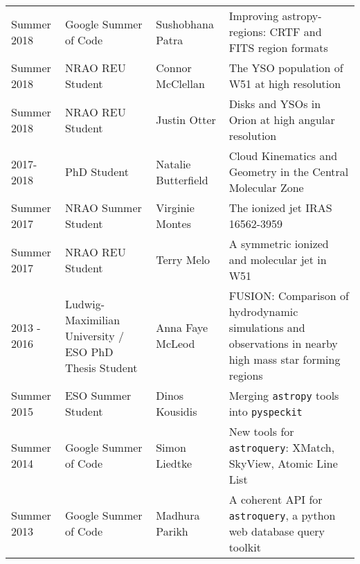 \begin{tabular}{p{0.75in}p{1.3in}lp{2.6in}}
    Summer 2018 & Google Summer of Code &                                         Sushobhana Patra    &  Improving astropy-regions: CRTF and FITS region formats \\
    Summer 2018 & NRAO REU Student &                                              Connor McClellan    &  The YSO population of W51 at high resolution \\
    Summer 2018 & NRAO REU Student &                                              Justin Otter    &  Disks and YSOs in Orion at high angular resolution \\
    2017-2018 & PhD Student &                                                        Natalie Butterfield &  Cloud Kinematics and Geometry in the Central Molecular Zone \\
    Summer 2017 & NRAO Summer Student &                                              Virginie Montes    &  The ionized jet IRAS 16562-3959 \\
    Summer 2017 & NRAO REU Student &                                                 Terry Melo    &  A symmetric ionized and molecular jet in W51 \\
    2013 - 2016 & Ludwig-Maximilian University / ESO PhD Thesis Student & Anna Faye McLeod &  FUSION: Comparison of hydrodynamic simulations and observations in nearby high mass star forming regions  \\
    Summer 2015 & ESO Summer Student &                                                 Dinos Kousidis    &  Merging \texttt{astropy} tools into \texttt{pyspeckit} \\
    Summer 2014 & Google Summer of Code &                                                 Simon Liedtke    &  New tools for \texttt{astroquery}: XMatch, SkyView, Atomic Line List \\
    Summer 2013 & Google Summer of Code &                                                 Madhura Parikh   &  A coherent API for \texttt{astroquery}, a python web database query toolkit \\
\end{tabular}

